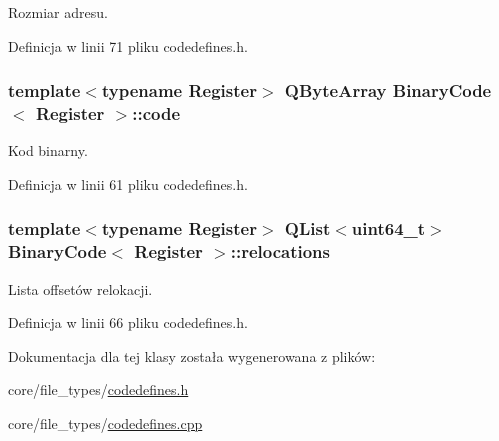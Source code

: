 Rozmiar adresu. 



Definicja w linii 71 pliku codedefines.\-h.

\hypertarget{class_binary_code_aa680c4ee3718fe9c7998b3ab072fc01a}{
\subsubsection[{code}]{\setlength{\rightskip}{0pt plus 5cm}template$<$typename Register$>$ Q\-Byte\-Array {\bf Binary\-Code}$<$ Register $>$\-::code\hspace{0.3cm}{\ttfamily [private]}}}\label{class_binary_code_aa680c4ee3718fe9c7998b3ab072fc01a}


Kod binarny. 



Definicja w linii 61 pliku codedefines.\-h.

\hypertarget{class_binary_code_a1816cae03a267887d41a56c6421c0d2d}{
\subsubsection[{relocations}]{\setlength{\rightskip}{0pt plus 5cm}template$<$typename Register$>$ Q\-List$<$uint64\-\_\-t$>$ {\bf Binary\-Code}$<$ Register $>$\-::relocations\hspace{0.3cm}{\ttfamily [private]}}}\label{class_binary_code_a1816cae03a267887d41a56c6421c0d2d}


Lista offsetów relokacji. 



Definicja w linii 66 pliku codedefines.\-h.



Dokumentacja dla tej klasy została wygenerowana z plików\-:\begin{DoxyCompactItemize}
\item 
core/file\-\_\-types/\hyperlink{codedefines_8h}{codedefines.\-h}\item 
core/file\-\_\-types/\hyperlink{codedefines_8cpp}{codedefines.\-cpp}\end{DoxyCompactItemize}
